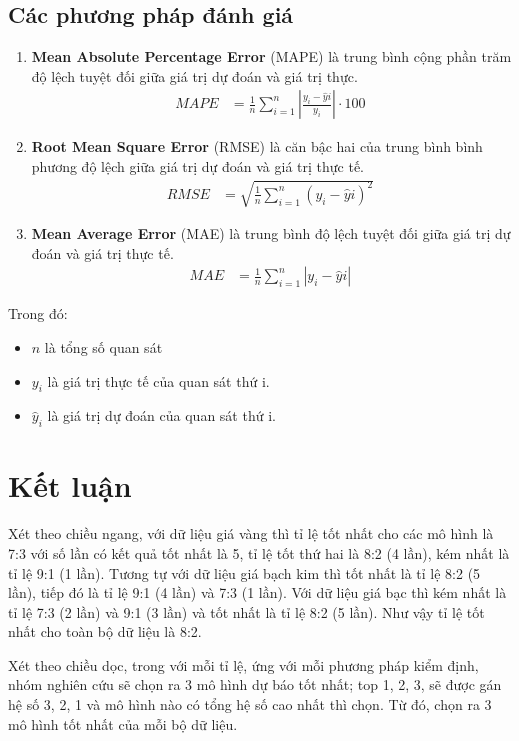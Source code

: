 \documentclass[conference]{IEEEtran}
\begin{document}
\subsection{Các phương pháp đánh giá}
\begin{enumerate}
    \item \textbf{Mean Absolute Percentage Error} (MAPE) là trung bình cộng phần trăm độ lệch tuyệt đối giữa giá trị dự đoán và giá trị thực.
    \begin{align*}
    MAPE &= \frac{1}{n} \sum_{i=1}^n \left|\frac{y_i - \hat{y}i}{y_i}\right| \cdot 100 \
    \end{align*}
    \item \textbf{Root Mean Square Error} (RMSE) là căn bậc hai của trung bình bình phương độ lệch giữa giá trị dự đoán và giá trị thực tế.
    \begin{align*}
    RMSE &= \sqrt{\frac{1}{n} \sum_{i=1}^n (y_i - \hat{y}i)^2} \
    \end{align*}
    \item \textbf{Mean Average Error} (MAE) là trung bình độ lệch tuyệt đối giữa giá trị dự đoán và giá trị thực tế.
    \begin{align*}
    MAE &= \frac{1}{n} \sum_{i=1}^n |y_i - \hat{y}i| \
    \end{align*}
\end{enumerate}

\indent Trong đó:
\begin{itemize}
    \item $n$ là tổng số quan sát
    \item $y_i$ là giá trị thực tế của quan sát thứ i.
    \item $\hat{y}_i$ là giá trị dự đoán của quan sát thứ i.
\end{itemize}

\section{Kết luận}

\indent Xét theo chiều ngang, với dữ liệu giá vàng thì tỉ lệ tốt nhất cho các mô hình là 7:3 với số lần có kết quả tốt nhất là 5, tỉ lệ tốt thứ hai là 8:2 (4 lần), kém nhất là tỉ lệ 9:1 (1 lần). Tương tự với dữ liệu giá bạch kim thì tốt nhất là tỉ lệ 8:2 (5 lần), tiếp đó là tỉ lệ 9:1 (4 lần) và 7:3 (1 lần). Với dữ liệu giá bạc thì kém nhất là tỉ lệ 7:3 (2 lần) và 9:1 (3 lần) và tốt nhất là tỉ lệ 8:2 (5 lần). Như vậy tỉ lệ tốt nhất cho toàn bộ dữ liệu là 8:2.

\indent Xét theo chiều dọc, trong với mỗi tỉ lệ, ứng với mỗi phương pháp kiểm định, nhóm nghiên cứu sẽ chọn ra 3 mô hình dự báo tốt nhất; top 1, 2, 3, sẽ được gán hệ số 3, 2, 1 và mô hình nào có tổng hệ số cao nhất thì chọn. Từ đó, chọn ra 3 mô hình tốt nhất của mỗi bộ dữ liệu.
\end{document}
